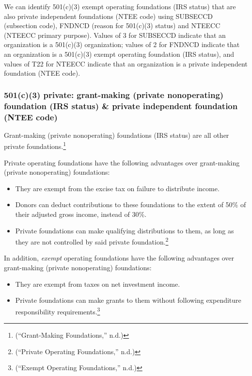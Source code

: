 \documentclass[
  letterpaper,
  DIV=11,
  numbers=noendperiod,
  oneside]{scrreprt}
\providecommand{\tightlist}{%
  \setlength{\itemsep}{0pt}\setlength{\parskip}{0pt}}\usepackage{longtable,booktabs,array}
\begin{document}
We can identify 501(c)(3) exempt operating foundations (IRS status) that
are also private independent foundations (NTEE code) using SUBSECCD
(subsection code), FNDNCD (reason for 501(c)(3) status) and NTEECC
(NTEECC primary purpose). Values of 3 for SUBSECCD indicate that an
organization is a 501(c)(3) organization; values of 2 for FNDNCD
indicate that an organization is a 501(c)(3) exempt operating foundation
(IRS status), and values of T22 for NTEECC indicate that an organization
is a private independent foundation (NTEE code).

\hypertarget{c3-private-grant-making-private-nonoperating-foundation-irs-status-private-independent-foundation-ntee-code}{%
\subsubsection{501(c)(3) private: grant-making (private nonoperating)
foundation (IRS status) \& private independent foundation (NTEE
code)}\label{c3-private-grant-making-private-nonoperating-foundation-irs-status-private-independent-foundation-ntee-code}}

Grant-making (private nonoperating) foundations (IRS status) are all
other private foundations.\footnote{({``Grant-Making Foundations,''}
  n.d.)}

Private operating foundations have the following advantages over
grant-making (private nonoperating) foundations:

\begin{itemize}
\tightlist
\item
  They are exempt from the excise tax on failure to distribute income.
\item
  Donors can deduct contributions to these foundations to the extent of
  50\% of their adjusted gross income, instead of 30\%.
\item
  Private foundations can make qualifying distributions to them, as long
  as they are not controlled by said private foundation.\footnote{({``Private
    Operating Foundations,''} n.d.)}
\end{itemize}

In addition, \emph{exempt} operating foundations have the following
advantages over grant-making (private nonoperating) foundations:

\begin{itemize}
\tightlist
\item
  They are exempt from taxes on net investment income.
\item
  Private foundations can make grants to them without following
  expenditure responsibility requirements.\footnote{({``Exempt Operating
    Foundations,''} n.d.)}
\end{itemize}
\end{document}

